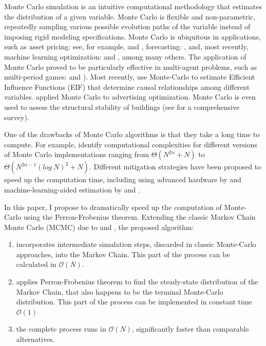 \documentclass{wscpaperproc}
\theoremstyle{wsc}
\begin{document}
Monte Carlo simulation is an intuitive computational methodology that estimates the distribution of a given variable. Monte Carlo is flexible and non-parametric, repeatedly sampling various possible evolution paths of the variable instead of imposing rigid modeling specifications. Monte Carlo is ubiquitous in applications, such as asset pricing: see, for example,  and , forecasting: , and, most recently, machine learning optimization:  and , among many others. The application of Monte Carlo proved to be particularly effective in multi-agent problems, such as multi-period games:  and ). Most recently,  use Monte-Carlo to estimate Efficient Influence Functions (EIF) that determine causal relationships among different variables.  applied Monte Carlo to advertising optimization. Monte Carlo is even used to assess the structural stability of buildings (see  for a comprehensive survey). 

One of the drawbacks of Monte Carlo algorithms is that they take a long time to compute. For example,  identify computational complexities for different versions of Monte Carlo implementations ranging from $\Theta(N^{2\alpha} + N)$ to $\Theta(N^{2\alpha-1}(log\: N)^2+N)$. Different mitigation strategies have been proposed to speed up the computation time, including using advanced hardware by  and machine-learning-aided estimation by  and . 

In this paper, I propose to dramatically speed up the computation of Monte-Carlo using the Perron-Frobenius theorem. Extending the classic Markov Chain Monte Carlo (MCMC) due to  and , the proposed algorithm:
\begin{enumerate}
    \item incorporates intermediate simulation steps, discarded in classic Monte-Carlo approaches, into the Markov Chain. This part of the process can be calculated in $\mathcal{O}(N)$.
    \item applies Perron-Frobenius theorem to find the steady-state distribution of the Markov Chain, that also happens to be the terminal Monte-Carlo distribution. This part of the process can be implemented in constant time $\mathcal{O}(1)$
    \item the complete process runs in $\mathcal{O}(N)$, significantly faster than comparable alternatives.  
\end{enumerate} 
\end{document}
